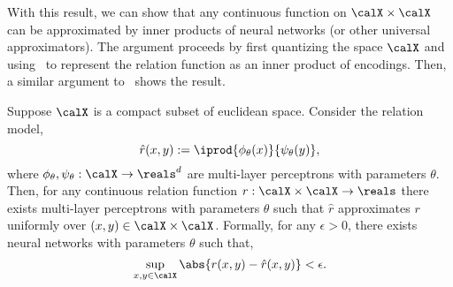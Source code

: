 
With this result, we can show that any continuous function on $\calX \times \calX$ can be approximated by inner products of neural networks (or other universal approximators). The argument proceeds by first quantizing the space $\calX$ and using~ to represent the relation function as an inner product of encodings. Then, a similar argument to~ shows the result.

\begin{theorem}\label{theorem:asymemtric_inner_prod_rel_func_class}
    Suppose $\calX$ is a compact subset of euclidean space. Consider the relation model,
    \begin{equation*}
        \hat{r}(x, y) := \iprod{\phi_\theta(x)}{\psi_\theta(y)},
    \end{equation*}
    \noindent where $\phi_\theta, \psi_\theta: \calX \to \reals^d$ are multi-layer perceptrons with parameters $\theta$. Then, for any continuous relation function $r: \calX \times \calX \to \reals$ there exists multi-layer perceptrons with parameters $\theta$ such that $\hat{r}$ approximates $r$ uniformly over $(x,y) \in \calX \times \calX$. Formally, for any $\epsilon > 0$, there exists neural networks with parameters $\theta$ such that,
    \begin{equation*}
        \sup_{x, y \in \calX} \abs{r(x,y) - \hat{r}(x,y)} < \epsilon.
    \end{equation*}
\end{theorem}

